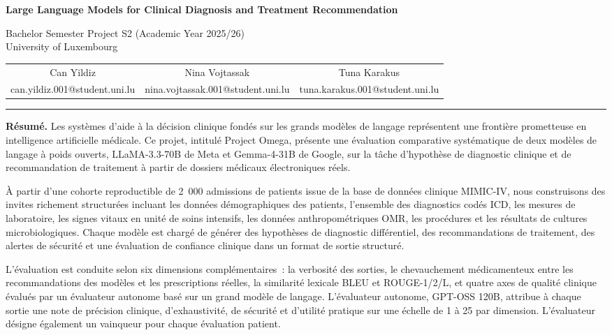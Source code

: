 \documentclass[11pt, a4paper]{article}
\begin{document}
\begin{center}
  {\Large \textbf{Large Language Models for Clinical Diagnosis and Treatment Recommendation}}

  \vspace{0.2cm}
  {\large Bachelor Semester Project S2 (Academic Year 2025/26)}\\
  {\large University of Luxembourg}

  \vspace{0.2cm}
  \begin{tabular}{ccc}
    \large Can Yildiz & \large Nina Vojtassak & \large Tuna Karakus \\
    \small can.yildiz.001@student.uni.lu &
    \small nina.vojtassak.001@student.uni.lu &
    \small tuna.karakus.001@student.uni.lu \\
  \end{tabular}

  \vspace{0.3cm}
  \rule{\linewidth}{0.4pt}
\end{center}

\vspace{0.3cm}

\textbf{R\'{e}sum\'{e}.}
Les syst\`{e}mes d'aide \`{a} la d\'{e}cision clinique fond\'{e}s sur les grands mod\`{e}les de langage repr\'{e}sentent une fronti\`{e}re prometteuse en intelligence artificielle m\'{e}dicale. Ce projet, intitul\'{e} Project Omega, pr\'{e}sente une \'{e}valuation comparative syst\'{e}matique de deux mod\`{e}les de langage \`{a} poids ouverts, LLaMA-3.3-70B de Meta et Gemma-4-31B de Google, sur la t\^{a}che d'hypoth\`{e}se de diagnostic clinique et de recommandation de traitement \`{a} partir de dossiers m\'{e}dicaux \'{e}lectroniques r\'{e}els.

\`{A} partir d'une cohorte reproductible de 2~000 admissions de patients issue de la base de donn\'{e}es clinique MIMIC-IV, nous construisons des invites richement structur\'{e}es incluant les donn\'{e}es d\'{e}mographiques des patients, l'ensemble des diagnostics cod\'{e}s ICD, les mesures de laboratoire, les signes vitaux en unit\'{e} de soins intensifs, les donn\'{e}es anthropom\'{e}triques OMR, les proc\'{e}dures et les r\'{e}sultats de cultures microbiologiques. Chaque mod\`{e}le est charg\'{e} de g\'{e}n\'{e}rer des hypoth\`{e}ses de diagnostic diff\'{e}rentiel, des recommandations de traitement, des alertes de s\'{e}curit\'{e} et une \'{e}valuation de confiance clinique dans un format de sortie structur\'{e}.

L'\'{e}valuation est conduite selon six dimensions compl\'{e}mentaires~: la verbosit\'{e} des sorties, le chevauchement m\'{e}dicamenteux entre les recommandations des mod\`{e}les et les prescriptions r\'{e}elles, la similarit\'{e} lexicale BLEU et ROUGE-1/2/L, et quatre axes de qualit\'{e} clinique \'{e}valu\'{e}s par un \'{e}valuateur autonome bas\'{e} sur un grand mod\`{e}le de langage. L'\'{e}valuateur autonome, GPT-OSS 120B, attribue \`{a} chaque sortie une note de pr\'{e}cision clinique, d'exhaustivit\'{e}, de s\'{e}curit\'{e} et d'utilit\'{e} pratique sur une \'{e}chelle de 1 \`{a} 25 par dimension. L'\'{e}valuateur d\'{e}signe \'{e}galement un vainqueur pour chaque \'{e}valuation patient.
\end{document}
